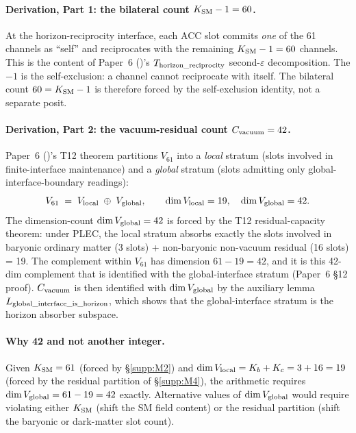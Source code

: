 \documentclass[11pt]{article}
\theoremstyle{plain}
\theoremstyle{definition}
\theoremstyle{remark}
\newcommand{\paperref}[2]{Paper~#1 (\emph{#2})}
\begin{document}
\paragraph{Derivation, Part 1: the bilateral count $K_{\rm SM} - 1 = 60$.}  At the horizon-reciprocity interface, each ACC slot commits \emph{one} of the 61 channels as ``self'' and reciprocates with the remaining $K_{\rm SM} - 1 = 60$ channels.  This is the content of \paperref{6}{}'s $T_{\rm horizon\_reciprocity}$ second-$\varepsilon$ decomposition.  The $-1$ is the self-exclusion: a channel cannot reciprocate with itself.  The bilateral count $60 = K_{\rm SM} - 1$ is therefore forced by the self-exclusion identity, not a separate posit.

\paragraph{Derivation, Part 2: the vacuum-residual count $C_{\rm vacuum} = 42$.}  \paperref{6}{}'s T12 theorem partitions $V_{61}$ into a \emph{local} stratum (slots involved in finite-interface maintenance) and a \emph{global} stratum (slots admitting only global-interface-boundary readings):
\[
  V_{61} \;=\; V_{\rm local} \;\oplus\; V_{\rm global}, \qquad
  \dim V_{\rm local} = 19, \quad \dim V_{\rm global} = 42.
\]
The dimension-count $\dim V_{\rm global} = 42$ is forced by the T12 residual-capacity theorem: under PLEC, the local stratum absorbs exactly the slots involved in baryonic ordinary matter (3 slots) + non-baryonic non-vacuum residual (16 slots) = 19.  The complement within $V_{61}$ has dimension $61 - 19 = 42$, and it is this 42-dim complement that is identified with the global-interface stratum (Paper~6 \S12 proof).  $C_{\rm vacuum}$ is then identified with $\dim V_{\rm global}$ by the auxiliary lemma $L_{\rm global\_interface\_is\_horizon}$, which shows that the global-interface stratum is the horizon absorber subspace.

\paragraph{Why 42 and not another integer.}  Given $K_{\rm SM} = 61$ (forced by \S\ref{supp:M2}) and $\dim V_{\rm local} = K_b + K_c = 3 + 16 = 19$ (forced by the residual partition of \S\ref{supp:M4}), the arithmetic requires $\dim V_{\rm global} = 61 - 19 = 42$ exactly.  Alternative values of $\dim V_{\rm global}$ would require violating either $K_{\rm SM}$ (shift the SM field content) or the residual partition (shift the baryonic or dark-matter slot count).
\end{document}
